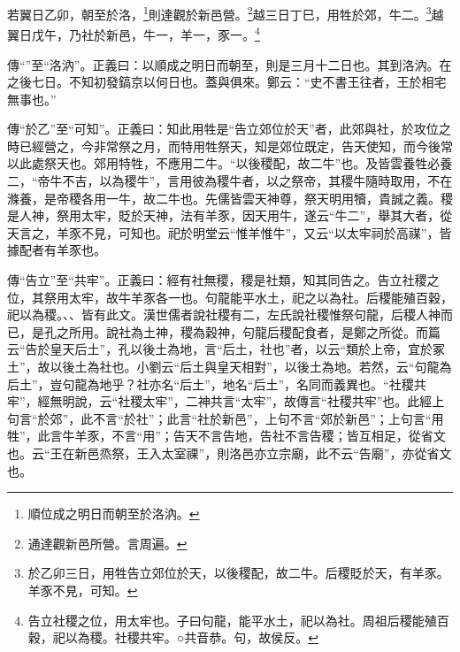 若翼日乙卯，朝至於洛，\footnote{順位成之明日而朝至於洛汭。}則達觀於新邑營。\footnote{通達觀新邑所營。言周遍。}越三日丁巳，用牲於郊，牛二。\footnote{於乙卯三日，用牲告立郊位於天，以後稷配，故二牛。后稷貶於天，有羊豕。羊豕不見，可知。}越翼日戊午，乃社於新邑，牛一，羊一，豕一。\footnote{告立社稷之位，用太牢也。子曰句龍，能平水土，祀以為社。周祖后稷能殖百穀，祀以為稷。社稷共牢。○共音恭。句，故侯反。}


{\noindent\zhuan{}\fzbyks 傳“”至“洛汭”。正義曰：以順成之明日而朝至，則是三月十二日也。其到洛汭。在之後七日。不知初發鎬京以何日也。蓋與俱來。鄭云：“史不書王往者，王於相宅無事也。” \par}

{\noindent\zhuan{}\fzbyks 傳“於乙”至“可知”。正義曰：知此用牲是“告立郊位於天”者，此郊與社，於攻位之時已經營之，今非常祭之月，而特用牲祭天，知是郊位既定，告天使知，而今後常以此處祭天也。郊用特牲，不應用二牛。“以後稷配，故二牛”也。及皆雲養牲必養二，“帝牛不吉，以為稷牛”，言用彼為稷牛者，以之祭帝，其稷牛隨時取用，不在滌養，是帝稷各用一牛，故二牛也。先儒皆雲天神尊，祭天明用犢，貴誠之義。稷是人神，祭用太牢，貶於天神，法有羊豕，因天用牛，遂云“牛二”，舉其大者，從天言之，羊豕不見，可知也。祀於明堂云“惟羊惟牛”，又云“以太牢祠於高禖”，皆據配者有羊豕也。 \par}

{\noindent\zhuan{}\fzbyks 傳“告立”至“共牢”。正義曰：經有社無稷，稷是社類，知其同告之。告立社稷之位，其祭用太牢，故牛羊豕各一也。句龍能平水土，祀之以為社。后稷能殖百穀，祀以為稷。、、皆有此文。漢世儒者說社稷有二，左氏說社稷惟祭句龍，后稷人神而已，是孔之所用。說社為土神，稷為穀神，句龍后稷配食者，是鄭之所從。而篇云“告於皇天后土”，孔以後土為地，言“后土，社也”者，以云“類於上帝，宜於冢土”，故以後土為社也。小劉云“后土與皇天相對”，以後土為地。若然，云“句龍為后土”，豈句龍為地乎？社亦名“后土”，地名“后土”，名同而義異也。“社稷共牢”，經無明說，云“社稷太牢”，二神共言“太牢”，故傳言“社稷共牢”也。此經上句言“於郊”，此不言“於社”；此言“社於新邑”，上句不言“郊於新邑”；上句言“用牲”，此言牛羊豕，不言“用”；告天不言告地，告社不言告稷；皆互相足，從省文也。云“王在新邑烝祭，王入太室祼”，則洛邑亦立宗廟，此不云“告廟”，亦從省文也。 \par}

